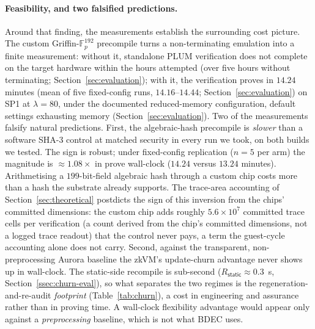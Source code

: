\paragraph{Feasibility, and two falsified predictions.}
Around that finding, the measurements establish the surrounding cost picture. The custom Griffin-$\mathbb{F}_p^{192}$ precompile turns a non-terminating emulation into a finite measurement: without it, standalone PLUM verification does not complete on the target hardware within the hours attempted (over five hours without terminating; Section~\ref{sec:evaluation}); with it, the verification proves in $14.24$ minutes (mean of five fixed-config runs, $14.16$--$14.44$; Section~\ref{sec:evaluation}) on SP1 at $\lambda=80$, under the documented reduced-memory configuration, default settings exhausting memory (Section~\ref{sec:evaluation}). Two of the measurements falsify natural predictions. First, the algebraic-hash precompile is \emph{slower} than a software SHA-3 control at matched security in every run we took, on both builds we tested. The sign is robust; under fixed-config replication ($n=5$ per arm) the magnitude is ${\approx}1.08\times$ in prove wall-clock ($14.24$ versus $13.24$ minutes). Arithmetising a $199$-bit-field algebraic hash through a custom chip costs more than a hash the substrate already supports. The trace-area accounting of Section~\ref{sec:theoretical} postdicts the sign of this inversion from the chips' committed dimensions: the custom chip adds roughly $5.6\times10^{7}$ committed trace cells per verification (a count derived from the chip's committed dimensions, not a logged trace readout) that the control never pays, a term the guest-cycle accounting alone does not carry. Second, against the transparent, non-preprocessing Aurora baseline the zkVM's update-churn advantage never shows up in wall-clock. The static-side recompile is sub-second ($R_{\mathsf{static}}\approx 0.3$~s, Section~\ref{ssec:churn-eval}), so what separates the two regimes is the regeneration-and-re-audit \emph{footprint} (Table~\ref{tab:churn}), a cost in engineering and assurance rather than in proving time. A wall-clock flexibility advantage would appear only against a \emph{preprocessing} baseline, which is not what BDEC uses.


